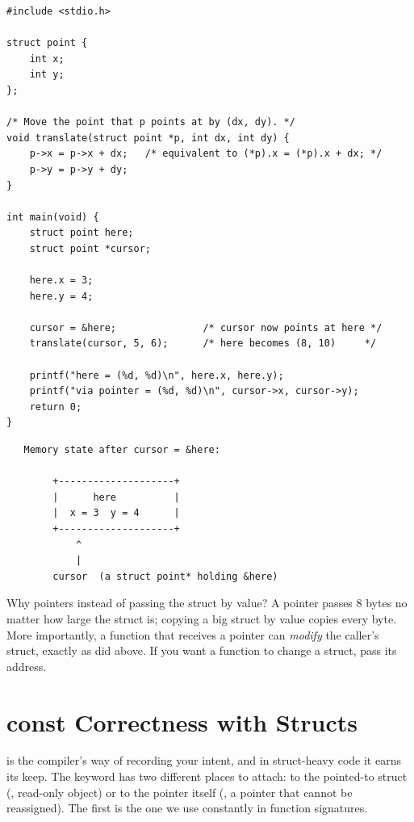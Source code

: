 \begin{lstlisting}[caption={Accessing fields through a pointer.}]
#include <stdio.h>

struct point {
    int x;
    int y;
};

/* Move the point that p points at by (dx, dy). */
void translate(struct point *p, int dx, int dy) {
    p->x = p->x + dx;   /* equivalent to (*p).x = (*p).x + dx; */
    p->y = p->y + dy;
}

int main(void) {
    struct point here;
    struct point *cursor;

    here.x = 3;
    here.y = 4;

    cursor = &here;               /* cursor now points at here */
    translate(cursor, 5, 6);      /* here becomes (8, 10)     */

    printf("here = (%d, %d)\n", here.x, here.y);
    printf("via pointer = (%d, %d)\n", cursor->x, cursor->y);
    return 0;
}
\end{lstlisting}

\begin{verbatim}
   Memory state after cursor = &here:

        +--------------------+
        |      here          |
        |  x = 3  y = 4      |
        +--------------------+
            ^
            |
        cursor  (a struct point* holding &here)
\end{verbatim}

Why pointers instead of passing the struct by value? A pointer passes 8
bytes no matter how large the struct is; copying a big struct by value
copies every byte. More importantly, a function that receives a pointer
can \emph{modify} the caller's struct, exactly as  did
above. If you want a function to change a struct, pass its address.

\section{const Correctness with Structs}

 is the compiler's way of recording your intent, and in
struct-heavy code it earns its keep. The keyword has two different
places to attach: to the pointed-to struct (, read-only object) or to the pointer itself (, a pointer that cannot be reassigned). The first is the one
we use constantly in function signatures.

